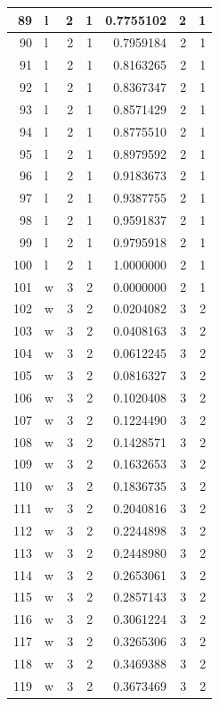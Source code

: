 \documentclass[
  letterpaper,
  DIV=11,
  numbers=noendperiod]{scrreprt}
\begin{document}
\begin{table}
\begin{tabular}[t]{r|l|r|r|r|r|r}
\hline
89 & l & 2 & 1 & 0.7755102 & 2 & 1\\
\hline
90 & l & 2 & 1 & 0.7959184 & 2 & 1\\
\hline
91 & l & 2 & 1 & 0.8163265 & 2 & 1\\
\hline
92 & l & 2 & 1 & 0.8367347 & 2 & 1\\
\hline
93 & l & 2 & 1 & 0.8571429 & 2 & 1\\
\hline
94 & l & 2 & 1 & 0.8775510 & 2 & 1\\
\hline
95 & l & 2 & 1 & 0.8979592 & 2 & 1\\
\hline
96 & l & 2 & 1 & 0.9183673 & 2 & 1\\
\hline
97 & l & 2 & 1 & 0.9387755 & 2 & 1\\
\hline
98 & l & 2 & 1 & 0.9591837 & 2 & 1\\
\hline
99 & l & 2 & 1 & 0.9795918 & 2 & 1\\
\hline
100 & l & 2 & 1 & 1.0000000 & 2 & 1\\
\hline
101 & w & 3 & 2 & 0.0000000 & 2 & 1\\
\hline
102 & w & 3 & 2 & 0.0204082 & 3 & 2\\
\hline
103 & w & 3 & 2 & 0.0408163 & 3 & 2\\
\hline
104 & w & 3 & 2 & 0.0612245 & 3 & 2\\
\hline
105 & w & 3 & 2 & 0.0816327 & 3 & 2\\
\hline
106 & w & 3 & 2 & 0.1020408 & 3 & 2\\
\hline
107 & w & 3 & 2 & 0.1224490 & 3 & 2\\
\hline
108 & w & 3 & 2 & 0.1428571 & 3 & 2\\
\hline
109 & w & 3 & 2 & 0.1632653 & 3 & 2\\
\hline
110 & w & 3 & 2 & 0.1836735 & 3 & 2\\
\hline
111 & w & 3 & 2 & 0.2040816 & 3 & 2\\
\hline
112 & w & 3 & 2 & 0.2244898 & 3 & 2\\
\hline
113 & w & 3 & 2 & 0.2448980 & 3 & 2\\
\hline
114 & w & 3 & 2 & 0.2653061 & 3 & 2\\
\hline
115 & w & 3 & 2 & 0.2857143 & 3 & 2\\
\hline
116 & w & 3 & 2 & 0.3061224 & 3 & 2\\
\hline
117 & w & 3 & 2 & 0.3265306 & 3 & 2\\
\hline
118 & w & 3 & 2 & 0.3469388 & 3 & 2\\
\hline
119 & w & 3 & 2 & 0.3673469 & 3 & 2\\

\end{tabular}
\end{table}
\end{document}
